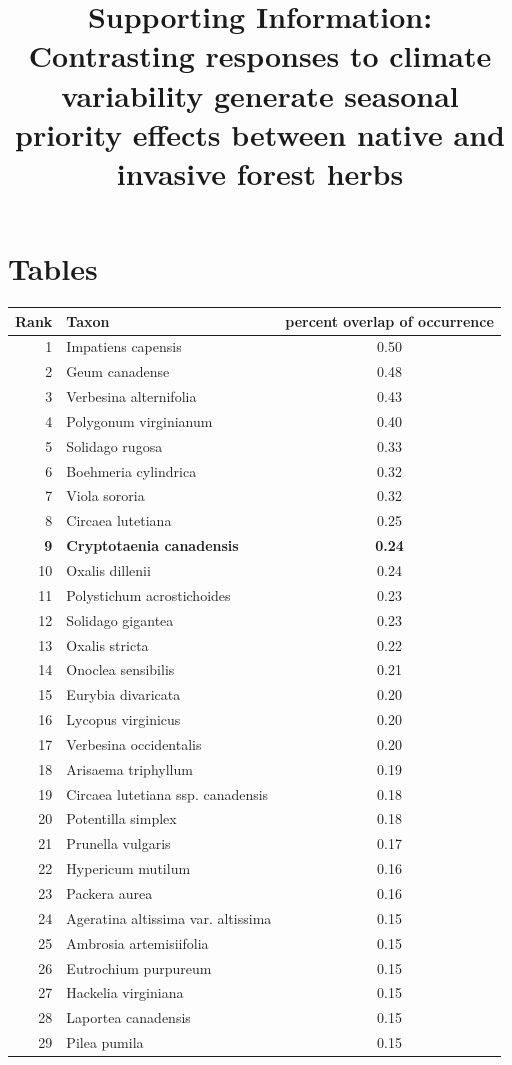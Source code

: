 \documentclass{article}[11pt]
\title{Supporting Information: Contrasting responses to climate variability generate seasonal priority effects between native and invasive forest herbs}
\date{}
\begin{document}

\maketitle
\pagebreak
\section*{Tables}
\begin{table}[hp]
\centering
\begin{tabular}{|r|l|c|}
  \hline
 Rank & Taxon & percent overlap of occurrence \\ 
  \hline
1 & Impatiens capensis & 0.50 \\ 
  2 & Geum canadense & 0.48 \\ 
  3 & Verbesina alternifolia & 0.43 \\ 
  4 & Polygonum virginianum & 0.40 \\ 
  5 & Solidago rugosa & 0.33 \\ 
  6 & Boehmeria cylindrica & 0.32 \\ 
  7 & Viola sororia & 0.32 \\ 
  8 & Circaea lutetiana & 0.25 \\ 
  \hline
  \textbf{9} & \textbf{Cryptotaenia canadensis} & \textbf{0.24} \\ 
  \hline
  10 & Oxalis dillenii & 0.24 \\ 
  11 & Polystichum acrostichoides & 0.23 \\ 
  12 & Solidago gigantea & 0.23 \\ 
  13 & Oxalis stricta & 0.22 \\ 
  14 & Onoclea sensibilis & 0.21 \\ 
  15 & Eurybia divaricata & 0.20 \\ 
  16 & Lycopus virginicus & 0.20 \\ 
  17 & Verbesina occidentalis & 0.20 \\ 
  18 & Arisaema triphyllum & 0.19 \\ 
  19 & Circaea lutetiana ssp. canadensis & 0.18 \\ 
  20 & Potentilla simplex & 0.18 \\ 
  21 & Prunella vulgaris & 0.17 \\ 
  22 & Hypericum mutilum & 0.16 \\ 
  23 & Packera aurea & 0.16 \\ 
  24 & Ageratina altissima var. altissima & 0.15 \\ 
  25 & Ambrosia artemisiifolia & 0.15 \\ 
  26 & Eutrochium purpureum & 0.15 \\ 
  27 & Hackelia virginiana & 0.15 \\ 
  28 & Laportea canadensis & 0.15 \\ 
  29 & Pilea pumila & 0.15 \\ 


\end{tabular}
\end{table}
\end{document}
